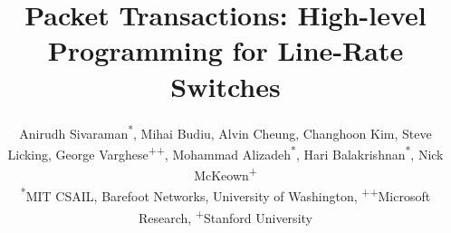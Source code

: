 \documentclass[10pt]{sig-alternate-05-2015}
\begin{document}


\date{}

\title{Packet Transactions: High-level Programming for Line-Rate Switches}
\author{
\alignauthor \fontsize{10.7}{9.9}\selectfont Anirudh Sivaraman\textsuperscript{*}, Mihai Budiu\textsuperscript{\dag}, Alvin Cheung\textsuperscript{\ddag}, Changhoon Kim\textsuperscript{\dag}, Steve Licking\textsuperscript{\dag}, \fontsize{10.7}{9.9}\selectfont George Varghese\textsuperscript{++}, Mohammad Alizadeh\textsuperscript{*}, Hari Balakrishnan\textsuperscript{*}, Nick McKeown\textsuperscript{+}\\
\affaddr \fontsize{10.7}{9.9}\selectfont \textsuperscript{*}MIT CSAIL, \textsuperscript{\dag}Barefoot Networks, \textsuperscript{\ddag}University of Washington, \textsuperscript{++}Microsoft Research, \textsuperscript{+}Stanford University
}

\maketitle











{\tiny 
}

%
\end{document}
